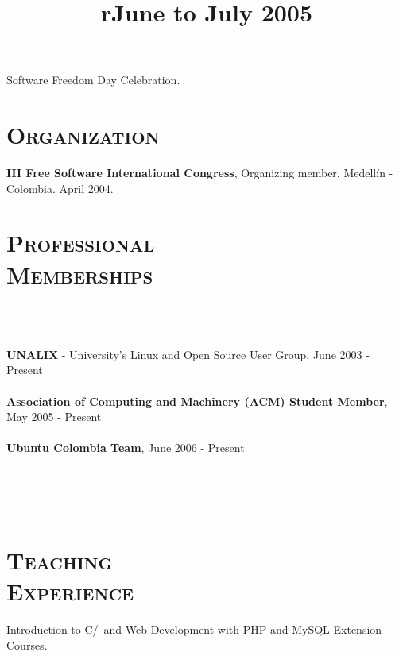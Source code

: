 \begin{resume}
\begin{position}
Software Freedom Day Celebration.
\end{position}



\section{\textsc{Organization}}
\employer{\textbf{}}
\dates{}
\textbf{III Free Software International Congress}, Organizing member. Medell\'{i}n - Colombia. April 2004.
\newline     


\section{\textsc{Professional\\ Memberships}}

\begin{formatb}
  \\
  \body\\
\end{formatb}
\employer{}
   {\textbf{UNALIX} - University's Linux and Open Source User Group,
     June 2003 - Present \\ \\
    \textbf{Association of Computing and Machinery (ACM) Student
      Member}, May 2005 - Present \\ \\
    \textbf{Ubuntu Colombia Team}, June 2006 - Present 
     }



\begin{formatb}
  \title{r}\\
  \\
 \body\\
\end{formatb}

\section{\textsc{Teaching\\ Experience}}
\title{\textbf{June to July 2005}}
\begin{position}
Introduction to C/\Cplusplus\ and Web Development with PHP and MySQL Extension Courses.
\end{position}



\end{resume}
